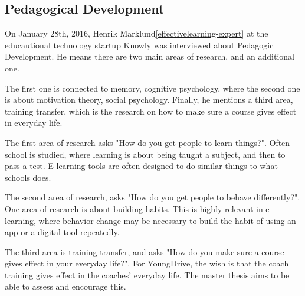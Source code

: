\subsection{Pedagogical Development}

On January 28th, 2016, Henrik Marklund\ref{effectivelearning-expert} at the educautional technology startup Knowly was interviewed about Pedagogic Development. He means there are two main areas of research, and an additional one. 

The first one is connected to memory, cognitive psychology, where the second one is about motivation theory, social psychology. Finally, he mentions a third area, training transfer, which is the research on how to make sure a course gives effect in everyday life.

The first area of research asks "How do you get people to learn things?". Often school is studied, where learning is about being taught a subject, and then to pass a test. E-learning tools are often designed to do similar things to what schools does.

The second area of research, asks "How do you get people to behave differently?". One area of research is about building habits. This is highly relevant in e-learning, where behavior change may be necessary to build the habit of using an app or a digital tool repeatedly.

The third area is training transfer, and asks "How do you make sure a course gives effect in your everyday life?". For YoungDrive, the wish is that the coach training gives effect in the coaches' everyday life. The master thesis aims to be able to assess and encourage this.